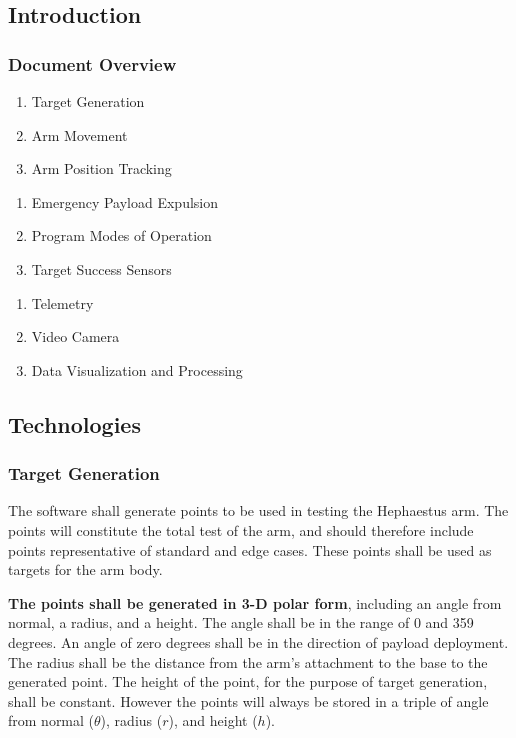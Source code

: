 \subsection{Introduction}
\subsubsection{Document Overview}
\begin{enumerate}
\item{Target Generation}
\item{Arm Movement}
\item{Arm Position Tracking}
\end{enumerate}
\begin{enumerate}
\item{Emergency Payload Expulsion}
\item{Program Modes of Operation}
\item{Target Success Sensors}
\end{enumerate}
\begin{enumerate}
\item{Telemetry}
\item{Video Camera}
\item{Data Visualization and Processing}
\end{enumerate}

\subsection{Technologies}
\subsubsection{Target Generation}
The software shall generate points to be used in testing the Hephaestus arm.
The points will constitute the total test of the arm, and should therefore include points
representative of standard and edge cases.
These points shall be used as targets for the arm body.

\textbf{The points shall be generated in 3-D polar form}, including an angle from normal, a radius, 
and a height. 
The angle shall be in the range of 0 and 359 degrees.
An angle of zero degrees shall be in the direction of payload deployment.
The radius shall be the distance from the arm's attachment to the base to the generated point.
The height of the point, for the purpose of target generation, shall be constant.
However the points will always be stored in a triple of angle from normal (\(\theta\)), radius (\(r\)), and height (\(h\)).

